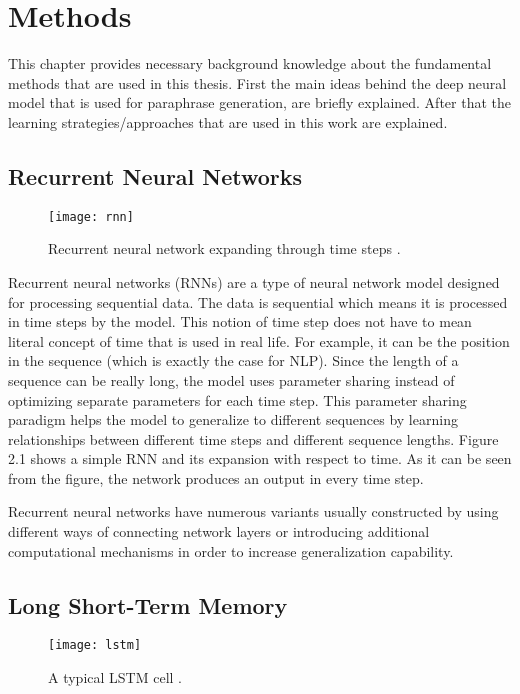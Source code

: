 \chapter{Methods}\label{methods}

This chapter provides necessary background knowledge about the fundamental methods that are used in this thesis. First the main ideas behind the deep neural model that is used for paraphrase generation, are briefly explained. After that the learning strategies/approaches that are used in this work are explained.

\section{Recurrent Neural Networks}

\begin{figure}[t]
\texttt{[image: rnn]}
\centering
\caption{Recurrent neural network expanding through time steps \cite{zhao}.}
\end{figure}

Recurrent neural networks (RNNs) are a type of neural network model designed for processing sequential data. The data is sequential which means it is processed in time steps by the model. This notion of time step does not have to mean literal concept of time that is used in real life. For example, it can be the position in the sequence (which is exactly the case for NLP). Since the length of a sequence can be really long, the model uses parameter sharing instead of optimizing separate parameters for each time step. This parameter sharing paradigm helps the model to generalize to different sequences by learning relationships between different time steps and different sequence lengths. Figure 2.1 shows a simple RNN and its expansion with respect to time. As it can be seen from the figure, the network produces an output in every time step.

Recurrent neural networks have numerous variants usually constructed by using different ways of connecting network layers or introducing additional computational mechanisms in order to increase generalization capability. 

\section{Long Short-Term Memory}

\begin{figure}[t]
\texttt{[image: lstm]}
\centering
\caption{A typical LSTM cell \cite{paszke}.}
\end{figure}

